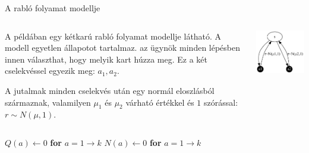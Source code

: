 \documentclass[english, aspectratio=169]{beamer}
\begin{document}
\begin{frame}{A rabló folyamat modellje}
\begin{columns}
\begin{column}{.5\textwidth}
A példában egy kétkarú rabló folyamat modellje látható. A modell egyetlen állapotot tartalmaz. az ügynök minden lépésben innen választhat, hogy melyik kart húzza meg. Ez a két cselekvéssel egyezik meg: $a_{1}, a_{2}$.\par\smallskip
A jutalmak minden cselekvés után egy normál eloszlásból származnak, valamilyen $\mu_{1}$ és $\mu_{2}$ várható értékkel és $1$ szórással: $r\sim N(\mu,1)$.
\end{column}
\begin{column}{.5\textwidth}
\begin{center}
\includegraphics[width=7cm, keepaspectratio]{graphs/solving_0.png}
\end{center}
\end{column}
\end{columns}
\end{frame}

\begin{frame}
\begin{algorithm}[H]
\caption{Rabló játék}
\SetAlgoLined
	$Q(a)\leftarrow0$ \textbf{for} $a=1\rightarrow k$
	$N(a)\leftarrow	0$ \textbf{for} $a=1\rightarrow k$
\end{algorithm}
\end{frame}
\end{document}
